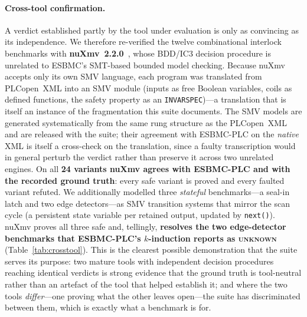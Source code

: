 \paragraph{Cross-tool confirmation.}
A verdict established partly by the tool under evaluation is only as convincing as its
independence. We therefore re-verified the twelve combinational interlock benchmarks with
\textbf{nuXmv~2.2.0}~\citep{cavada_nuxmv_2014}, whose BDD/IC3 decision procedure is unrelated to ESBMC's SMT-based
bounded model checking. Because nuXmv accepts only its own SMV language, each program was
translated from PLCopen~XML into an SMV module (inputs as free Boolean variables, coils as
defined functions, the safety property as an \texttt{INVARSPEC})---a translation that is
itself an instance of the fragmentation this suite documents. The SMV models are generated
systematically from the same rung structure as the PLCopen~XML and are released with the suite;
their agreement with ESBMC-PLC on the \emph{native} XML is itself a cross-check on the
translation, since a faulty transcription would in general perturb the verdict rather than
preserve it across two unrelated engines. On all \textbf{24 variants
nuXmv agrees with ESBMC-PLC and with the recorded ground truth}: every safe variant is
proved and every faulted variant refuted. We additionally modelled three \emph{stateful}
benchmarks---a seal-in latch and two edge detectors---as SMV transition systems that mirror
the scan cycle (a persistent state variable per retained output, updated by \texttt{next()}).
nuXmv proves all three safe and, tellingly, \textbf{resolves the two edge-detector benchmarks
that ESBMC-PLC's $k$-induction reports as \textsc{unknown}} (Table~\ref{tab:crosstool}). This
is the clearest possible demonstration that the suite serves its purpose: two mature tools
with independent decision procedures reaching identical verdicts is strong evidence that the
ground truth is tool-neutral rather than an artefact of the tool that helped establish it; and
where the two tools \emph{differ}---one proving what the other leaves open---the suite has
discriminated between them, which is exactly what a benchmark is for.

